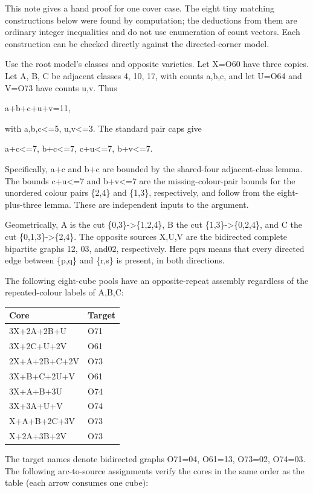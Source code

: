 \documentclass[
  10pt,
]{article}
\begin{document}
This note gives a hand proof for one cover case. The eight tiny matching
constructions below were found by computation; the deductions from them
are ordinary integer inequalities and do not use enumeration of count
vectors. Each construction can be checked directly against the
directed-corner model.

Use the root model's classes and opposite varieties. Let X=O60 have
three copies. Let A, B, C be adjacent classes 4, 10, 17, with counts
a,b,c, and let U=O64 and V=O73 have counts u,v. Thus

a+b+c+u+v=11,

with a,b,c\textless=5, u,v\textless=3. The standard pair caps give

a+c\textless=7, b+c\textless=7, c+u\textless=7, b+v\textless=7.

Specifically, a+c and b+c are bounded by the shared-four adjacent-class
lemma. The bounds c+u\textless=7 and b+v\textless=7 are the
missing-colour-pair bounds for the unordered colour pairs \{2,4\} and
\{1,3\}, respectively, and follow from the eight-plus-three lemma. These
are independent inputs to the argument.

Geometrically, A is the cut \{0,3\}-\textgreater\{1,2,4\}, B the cut
\{1,3\}-\textgreater\{0,2,4\}, and C the cut
\{0,1,3\}-\textgreater\{2,4\}. The opposite sources X,U,V are the
bidirected complete bipartite graphs 12, 03,
and02, respectively. Here pq\textbar rs means that every
directed edge between \{p,q\} and \{r,s\} is present, in both
directions.

The following eight-cube pools have an opposite-repeat assembly
regardless of the repeated-colour labels of A,B,C:

\begin{longtable}[]{@{}ll@{}}
\toprule\noalign{}
Core & Target \\
\midrule\noalign{}
\endhead
\bottomrule\noalign{}
\endlastfoot
3X+2A+2B+U & O71 \\
3X+2C+U+2V & O61 \\
2X+A+2B+C+2V & O73 \\
3X+B+C+2U+V & O61 \\
3X+A+B+3U & O74 \\
3X+3A+U+V & O74 \\
X+A+B+2C+3V & O73 \\
X+2A+3B+2V & O73 \\
\end{longtable}

The target names denote bidirected graphs O71=04,
O61=13, O73=02, O74=03. The following
arc-to-source assignments verify the cores in the same order as the
table (each arrow consumes one cube):
\end{document}
